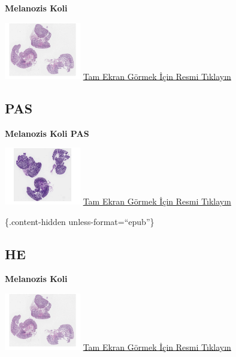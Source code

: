\documentclass[
  letterpaper,
  DIV=11,
  numbers=noendperiod]{scrreprt}
\begin{document}
\textbf{Melanozis Koli}

\href{https://images.patolojiatlasi.com/melanosiscoli/HE.html}{\includegraphics[width=0.25\textwidth,height=\textheight]{./screenshots/thumbnail_melanosiscoli-HE.png}}
\href{https://images.patolojiatlasi.com/melanosiscoli/HE.html}{Tam Ekran
Görmek İçin Resmi Tıklayın}

\hypertarget{pas-1}{%
\subsection{PAS}\label{pas-1}}

\textbf{Melanozis Koli PAS}

\href{https://images.patolojiatlasi.com/melanosiscoli/PAS.html}{\includegraphics[width=0.25\textwidth,height=\textheight]{./screenshots/thumbnail_melanosiscoli-PAS.png}}
\href{https://images.patolojiatlasi.com/melanosiscoli/PAS.html}{Tam
Ekran Görmek İçin Resmi Tıklayın}

\{.content-hidden unless-format=``epub''\}

\hypertarget{he-2}{%
\subsection{HE}\label{he-2}}

\textbf{Melanozis Koli}

\href{https://images.patolojiatlasi.com/melanosiscoli/HE.html}{\includegraphics[width=0.25\textwidth,height=\textheight]{./screenshots/thumbnail_melanosiscoli-HE.png}}
\href{https://images.patolojiatlasi.com/melanosiscoli/HE.html}{Tam Ekran
Görmek İçin Resmi Tıklayın}
\end{document}
